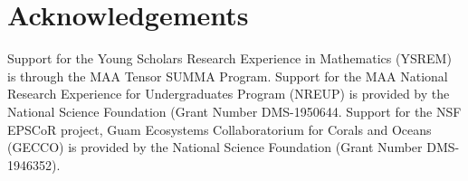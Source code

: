 \documentclass[12pt]{article}
\begin{document}
\section{Acknowledgements}
Support for the Young Scholars Research Experience in Mathematics (YSREM)  is through the MAA Tensor SUMMA Program. Support for the MAA National Research Experience for Undergraduates Program (NREUP) is provided by the National Science Foundation (Grant Number DMS-1950644. Support for the NSF EPSCoR project, Guam Ecosystems Collaboratorium for Corals and Oceans (GECCO) is provided by the National Science Foundation (Grant Number DMS-1946352).

\newpage
% 
% 
\printbibliography
\end{document}
